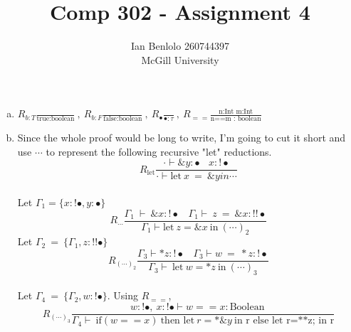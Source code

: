 
\usepackage{cancel}
\usepackage{verbatim}
\usepackage{enumerate}
\usepackage{appendix}
\title{Comp 302 - Assignment 4}
\author{Ian Benlolo 260744397\\McGill University \\}

\maketitle
\begin{enumerate}[(a)]
\item $R_{b:T}\frac{}{\text{true:boolean}}\ ,\ R_{b:F}\frac{}{\text{false:boolean}}\ ,\  R_{\bullet}\frac{}{\bullet : \tau}\ ,\ R_{==}\frac{\text{n:Int\ \ m:Int}}{\text{n==m\ :\ boolean}}$\\


\item
Since the whole proof would be long to write, I'm going to cut it short and use $\cdots$ to represent the following recursive "let" reductions.\\
$$R_{\text{let}}   \frac{\cdot \vdash  \&y: \bullet \ \ \ \ x :  \textbf{!}\bullet }{\cdot \vdash \text{let}\  x\ =\ \&y in \cdots } $$ \\

Let 
$\Gamma_1 = \{ x: \textbf{!}\bullet, y: \bullet \}$
$$ R_{\cdots}\frac{\Gamma_1\ \vdash\ \&x:\textbf{!}\bullet\ \ \ \ \Gamma_1\vdash\ z\ =\ \&x:\textbf{!!}\bullet }{\Gamma_1 \vdash \text{let}\ z = \&x\ \text{in}\ (\cdots)_2 } $$
Let $\Gamma_2\ =\ \{\Gamma_1, z:\textbf{!!}\bullet \} $\\
$$ R_{(\cdots)_2}\frac{ \Gamma_3\vdash *z:\textbf{!}\bullet\ \ \ \ \Gamma_3\vdash w\ =\ *z:\textbf{!}\bullet }{\Gamma_3\vdash\ \text{let}\ w=*z\ \text{in}\ (\cdots)_3} $$\\
Let $\Gamma_4\ =\ \{ \Gamma_2, w:\textbf{!}\bullet \} $.
Using $R_{==}$,
$$R_{(\cdots)_3}\frac{w:\textbf{!}\bullet,\ x: \textbf{!}\bullet\vdash w==x:\text{Boolean}\ \ \ \ \  }{\Gamma_4\vdash\ \text{if}(w==x)\ \text{then let}\ r =*\&y\ \text{in r else let r=**z; in r} }$$


\end{enumerate}
